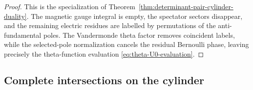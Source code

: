 \documentclass[11pt,a4paper]{article}
\makeatletter
\numberwithin{equation}{section}
\theoremstyle{plain}
\theoremstyle{definition}
\theoremstyle{remark}
\newcounter{mathrecordid}
\newcommand{\mathboxbegin}[1]{%
  \stepcounter{mathrecordid}%
  \immediate\write\mathrecords{\themathrecordid,#1}%
  \special{pdf:bann << /Type /Annot /Subtype /Link /Border [0 0 0]
    /MathBoxID \themathrecordid /F 2
    /A << /S /URI /URI (urn:mathbox:\themathrecordid) >> >>}}
\newcommand{\mathboxinlineplain}[1]{$#1$}
\newcommand{\mathboxinline}[1]{%
  $\mathboxbegin{inline}%
  \special{pdf:literal direct /MathBoxBegin\themathrecordid\space MP}%
  #1\special{pdf:literal direct /MathBoxEnd\themathrecordid\space MP}%
  \special{pdf:eann}$}
\newcommand{\recordmath}{%
  \ifmeasuring@\expandafter\mathboxinlineplain
  \else\expandafter\mathboxinline\fi}
\makeatother
\begin{document}
\begin{proof}
This is the \recordmath{n=0} specialization of Theorem~\ref{thm:determinant-pair-cylinder-duality}.  The magnetic gauge integral is empty, the spectator sectors disappear, and the remaining electric residues are labelled by permutations of the \recordmath{N} anti-fundamental poles.  The Vandermonde theta factor removes coincident labels, while the selected-pole normalization cancels the residual Bernoulli phase, leaving precisely the theta-function evaluation \eqref{eq:theta-U0-evaluation}.
\end{proof}

\subsection{Complete intersections on the cylinder}
\label{sec:complete-intersections-cylinder}
\end{document}
